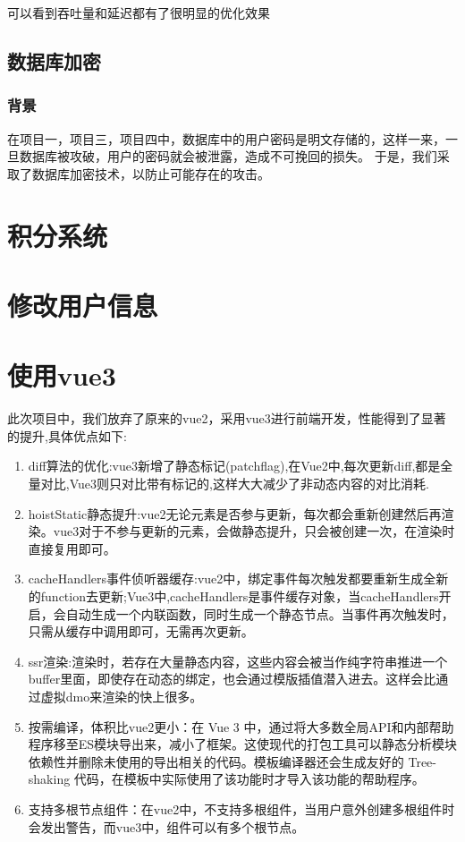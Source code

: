 可以看到吞吐量和延迟都有了很明显的优化效果

\subsection{数据库加密}
\subsubsection{背景}
在项目一，项目三，项目四中，数据库中的用户密码是明文存储的，这样一来，一旦数据库被攻破，用户的密码就会被泄露，造成不可挽回的损失。
于是，我们采取了数据库加密技术，以防止可能存在的攻击。

\section{积分系统}

\section{修改用户信息}


\section{使用vue3}
此次项目中，我们放弃了原来的vue2，采用vue3进行前端开发，性能得到了显著的提升,具体优点如下:
\begin{enumerate}
	\item {diff算法的优化}:vue3新增了静态标记(patchflag),在Vue2中,每次更新diff,都是全量对比,Vue3则只对比带有标记的,这样大大减少了非动态内容的对比消耗.
	\item {hoistStatic静态提升}:vue2无论元素是否参与更新，每次都会重新创建然后再渲染。vue3对于不参与更新的元素，会做静态提升，只会被创建一次，在渲染时直接复用即可。
	\item {cacheHandlers事件侦听器缓存}:vue2中，绑定事件每次触发都要重新生成全新的function去更新;Vue3中,cacheHandlers是事件缓存对象，当cacheHandlers开启，会自动生成一个内联函数，同时生成一个静态节点。当事件再次触发时，只需从缓存中调用即可，无需再次更新。
	\item {ssr渲染}:渲染时，若存在大量静态内容，这些内容会被当作纯字符串推进一个buffer里面，即使存在动态的绑定，也会通过模版插值潜入进去。这样会比通过虚拟dmo来渲染的快上很多。
	\item {按需编译，体积比vue2更小}：在 Vue 3 中，通过将大多数全局API和内部帮助程序移至ES模块导出来，减小了框架。这使现代的打包工具可以静态分析模块依赖性并删除未使用的导出相关的代码。模板编译器还会生成友好的 Tree-shaking 代码，在模板中实际使用了该功能时才导入该功能的帮助程序。
	\item {支持多根节点组件}：在vue2中，不支持多根组件，当用户意外创建多根组件时会发出警告，而vue3中，组件可以有多个根节点。
\end{enumerate}